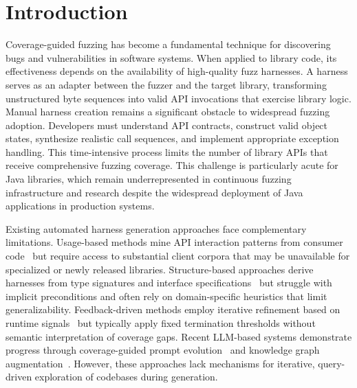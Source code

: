 \section{Introduction}

Coverage-guided fuzzing has become a fundamental technique for discovering bugs and vulnerabilities in software systems. When applied to library code, its effectiveness depends on the availability of high-quality fuzz harnesses. A harness serves as an adapter between the fuzzer and the target library, transforming unstructured byte sequences into valid API invocations that exercise library logic. Manual harness creation remains a significant obstacle to widespread fuzzing adoption. Developers must understand API contracts, construct valid object states, synthesize realistic call sequences, and implement appropriate exception handling. This time-intensive process limits the number of library APIs that receive comprehensive fuzzing coverage. This challenge is particularly acute for Java libraries, which remain underrepresented in continuous fuzzing infrastructure and research despite the widespread deployment of Java applications in production systems. 

Existing automated harness generation approaches face complementary limitations. Usage-based methods mine API interaction patterns from consumer code~\cite{DBLP:conf/sigsoft/BabicBCIKKLSW19:FUDGE,DBLP:conf/sp/JeongJYMKJKSH23:UTopia} but require access to substantial client corpora that may be unavailable for specialized or newly released libraries. Structure-based approaches derive harnesses from type signatures and interface specifications~\cite{DBLP:conf/icse/GreenA22:GraphFuzz,DBLP:conf/icse/ShermanN25:OGHarn} but struggle with implicit preconditions and often rely on domain-specific heuristics that limit generalizability. Feedback-driven methods employ iterative refinement based on runtime signals~\cite{DBLP:conf/uss/ZhangLZZZZXLL0H23:Rubick} but typically apply fixed termination thresholds without semantic interpretation of coverage gaps. Recent LLM-based systems demonstrate progress through coverage-guided prompt evolution~\cite{DBLP:conf/ccs/LyuXCC24:PromptFuzz} and knowledge graph augmentation~\cite{DBLP:conf/icse/XuMZZCHLW25:CKGFuzzer}. However, these approaches lack mechanisms for iterative, query-driven exploration of codebases during generation. 

